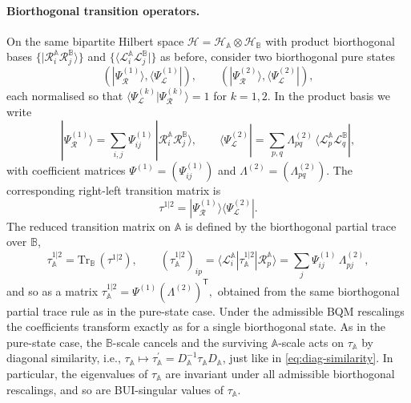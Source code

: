 \documentclass[11pt,a4paper]{article}
\begin{document}
\paragraph{Biorthogonal transition operators.}
On the same bipartite Hilbert space $\mathcal H=\mathcal H_\mathbb{A}\otimes\mathcal H_\mathbb{B}$ with product biorthogonal bases $\{|\mathcal{R}^\mathbb{A}_i \mathcal{R}^\mathbb{B}_j\rangle\}$ and $\{\langle \mathcal{L}^\mathbb{A}_i \mathcal{L}^\mathbb{B}_j|\}$ as before, consider two biorthogonal pure states
\begin{equation}
(|\Psi^{(1)}_{\mathcal{R}}\rangle,\langle\Psi^{(1)}_{\mathcal{L}}|),
\qquad
(|\Psi^{(2)}_{\mathcal{R}}\rangle,\langle\Psi^{(2)}_{\mathcal{L}}|),
\end{equation}
each normalised so that $\langle\Psi^{(k)}_{\mathcal{L}}|\Psi^{(k)}_{\mathcal{R}}\rangle=1$ for $k=1,2$. In the product basis we write
\begin{equation}
|\Psi^{(1)}_{\mathcal{R}}\rangle
= \sum_{i,j}\Psi^{(1)}_{ij}\,|\mathcal{R}^\mathbb{A}_i \mathcal{R}^\mathbb{B}_j\rangle,
\qquad
\langle\Psi^{(2)}_{\mathcal{L}}|
= \sum_{p,q}\Lambda^{(2)}_{pq}\,\langle \mathcal{L}^\mathbb{A}_p \mathcal{L}^\mathbb{B}_q|,
\end{equation}
with coefficient matrices $\Psi^{(1)}=(\Psi^{(1)}_{ij})$ and $\Lambda^{(2)}=(\Lambda^{(2)}_{pq})$. The corresponding right-left transition matrix is
\begin{equation}
\tau^{1|2}
=|\Psi^{(1)}_{\mathcal{R}}\rangle\langle\Psi^{(2)}_{\mathcal{L}}|.
\end{equation}
The reduced transition matrix on $\mathbb A$ is defined by the biorthogonal partial trace over $\mathbb B$,
\begin{equation}\label{BQM-trans-matrix}
\tau^{1|2}_\mathbb{A}
=\mathrm{Tr}_\mathbb{B}\, (\tau^{1|2}),\qquad
(\tau^{1|2}_\mathbb{A})_{ip}
=\langle \mathcal{L}^\mathbb{A}_i|\tau^{1|2}_\mathbb{A}|\mathcal{R}^\mathbb{A}_p\rangle
=\sum_j \Psi^{(1)}_{ij}\,\Lambda^{(2)}_{pj},
\end{equation}
and so as a matrix $\tau^{1|2}_\mathbb{A}=\Psi^{(1)}(\Lambda^{(2)})^{\mathsf T}, $ obtained from the same biorthogonal partial trace rule as in the pure-state case. Under the admissible BQM rescalings the coefficients transform exactly as for a single biorthogonal state. As in the pure-state case, the $\mathbb B$-scale cancels and the surviving $\mathbb A$-scale acts on $\tau_\mathbb{A}$ by diagonal similarity, i.e., $\tau_\mathbb{A} \mapsto \tau^\prime_\mathbb{A}=D_\mathbb{A}^{-1}\tau_\mathbb{A}D_\mathbb{A}$, just like in \cref{eq:diag-similarity}. In particular, the eigenvalues of $\tau_\mathbb{A}$ are invariant under all admissible biorthogonal rescalings, and so are BUI-singular values of $\tau_\mathbb{A}$.
\end{document}

